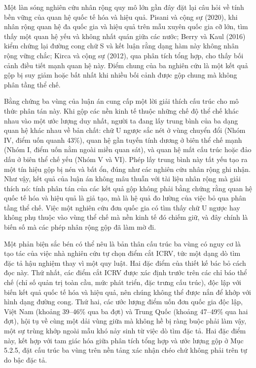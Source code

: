 \documentclass[
  a4paper,
  13pt]{extreport}
\begin{document}
Một làn sóng nghiên cứu nhân rộng quy mô lớn gần đây đặt lại câu hỏi về
tính bền vững của quan hệ quốc tế hóa và hiệu quả. Pisani và cộng sự
(2020), khi nhân rộng quan hệ đa quốc gia và hiệu quả trên mẫu xuyên
quốc gia cỡ lớn, tìm thấy một quan hệ yếu và không nhất quán giữa các
nước; Berry và Kaul (2016) kiểm chứng lại đường cong chữ S và kết luận
rằng dạng hàm này không nhân rộng vững chắc; Kirca và cộng sự (2012),
qua phân tích tổng hợp, cho thấy bối cảnh điều tiết mạnh quan hệ này.
Điểm chung của ba nghiên cứu là một kết quả gộp bị suy giảm hoặc bất
nhất khi nhiều bối cảnh được gộp chung mà không phân tầng thể chế.

Bằng chứng ba vùng của luận án cung cấp một lời giải thích cấu trúc cho
mô thức phân tán này. Khi gộp các nền kinh tế thuộc những chế độ thể chế
khác nhau vào một ước lượng duy nhất, người ta đang lấy trung bình của
ba dạng quan hệ khác nhau về bản chất: chữ U ngược sắc nét ở vùng chuyển
đổi (Nhóm IV, điểm uốn quanh 43\%), quan hệ gần tuyến tính dương ở biên
thể chế mạnh (Nhóm I, điểm uốn nằm ngoài miền quan sát), và quan hệ mất
cấu trúc hoặc đảo dấu ở biên thể chế yếu (Nhóm V và VI). Phép lấy trung
bình này tất yếu tạo ra một tín hiệu gộp bị nén và bất ổn, đúng như các
nghiên cứu nhân rộng ghi nhận. Như vậy, kết quả của luận án không mâu
thuẫn với tài liệu nhân rộng mà giải thích nó: tính phân tán của các kết
quả gộp không phải bằng chứng rằng quan hệ quốc tế hóa và hiệu quả là
giả tạo, mà là hệ quả đo lường của việc bỏ qua phân tầng thể chế. Việc
một nghiên cứu đơn quốc gia có tìm thấy chữ U ngược hay không phụ thuộc
vào vùng thể chế mà nền kinh tế đó chiếm giữ, và đây chính là biến số mà
các phép nhân rộng gộp đã làm mờ đi.

Một phản biện sắc bén có thể nêu là bản thân cấu trúc ba vùng có nguy cơ
là tạo tác của việc nhà nghiên cứu tự chọn điểm cắt ICRV, tức một dạng
dò tìm đặc tả hậu nghiệm thay vì một quy luật. Hai đặc điểm của thiết kế
bác bỏ cách đọc này. Thứ nhất, các điểm cắt ICRV được xác định trước
trên các chỉ báo thể chế (chỉ số quản trị toàn cầu, mức phát triển, đặc
trưng cấu trúc), độc lập với biến kết quả quốc tế hóa và hiệu quả, nên
chúng không thể được nắn để khớp với hình dạng đường cong. Thứ hai, các
ước lượng điểm uốn đơn quốc gia độc lập, Việt Nam (khoảng 39--46\% qua
ba đợt) và Trung Quốc (khoảng 47--49\% qua hai đợt), hội tụ về cùng một
dải vùng giữa mà không hề bị ràng buộc phải làm vậy, một sự trùng khớp
ngoài mẫu khó nảy sinh từ việc dò tìm đặc tả. Hai đặc điểm này, kết hợp
với tam giác hóa giữa phân tích tổng hợp và ước lượng gộp ở Mục 5.2.5,
đặt cấu trúc ba vùng trên nền tảng xác nhận chéo chứ không phải trên tự
do bậc đặc tả.
\end{document}
